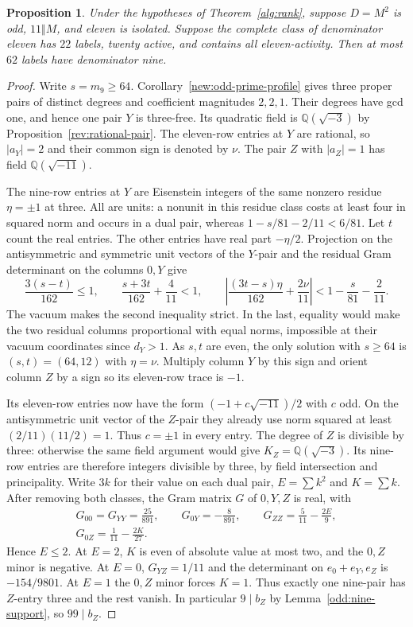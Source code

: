 \documentclass[11pt]{amsart}
\numberwithin{equation}{section}
\newtheorem{proposition}[theorem]{Proposition}
\theoremstyle{definition}
\theoremstyle{plain}
\newcommand{\QQ}{\mathbb Q}
\begin{document}
\begin{proposition}\label{odd:eleven-nine}
Under the hypotheses of Theorem~\ref{alg:rank}, suppose $D=M^2$
is odd, $11\Vert M$, and eleven is isolated. Suppose the complete
class of denominator eleven has $22$ labels, twenty active, and
contains all eleven-activity. Then at most $62$ labels have denominator nine.
\end{proposition}
\begin{proof}
Write $s=m_9\ge64$. Corollary~\ref{new:odd-prime-profile} gives three proper pairs of distinct degrees and coefficient magnitudes $2,2,1$. Their degrees have gcd one, and hence one pair $Y$ is three-free. Its quadratic field is $\QQ(\sqrt{-3})$ by Proposition~\ref{rev:rational-pair}. The eleven-row entries at $Y$ are rational, so $|a_Y|=2$ and their common sign is denoted by $\nu$. The pair $Z$ with $|a_Z|=1$ has field $\QQ(\sqrt{-11})$.

The nine-row entries at $Y$ are Eisenstein integers of the same
nonzero residue $\eta=\pm1$ at three. All are units: a nonunit
in this residue class costs at least four in squared norm and
occurs in a dual pair, whereas $1-s/81-2/11<6/81$. Let $t$
count the real entries. The other entries have real part $-\eta/2$.
Projection on the antisymmetric and symmetric unit vectors of the
$Y$-pair and the residual Gram determinant on the columns $0,Y$ give
\[
 \frac{3(s-t)}{162}\le1,\qquad
 \frac{s+3t}{162}+\frac4{11}<1,\qquad
 \left|\frac{(3t-s)\eta}{162}+\frac{2\nu}{11}\right|
 <1-\frac{s}{81}-\frac2{11}.
\]
The vacuum makes the second inequality strict. In the last,
equality would make the two residual columns proportional with equal
norms, impossible at their vacuum coordinates since $d_Y>1$.
As $s,t$ are even, the only solution with $s\ge64$ is
$(s,t)=(64,12)$ with $\eta=\nu$. Multiply column $Y$ by this sign
and orient column $Z$ by a sign so its eleven-row trace is $-1$.

Its eleven-row entries now have the form $(-1+c\sqrt{-11})/2$
with $c$ odd. On the antisymmetric unit vector of the $Z$-pair
they already use norm squared at least $(2/11)(11/2)=1$.
Thus $c=\pm1$ in every entry. The degree of $Z$ is divisible by
three: otherwise the same field argument would give
$K_Z=\QQ(\sqrt{-3})$. Its nine-row entries are therefore integers
divisible by three, by field intersection and principality. Write $3k$ for their value on each dual pair,
$E=\sum k^2$ and $K=\sum k$. After removing both classes,
the Gram matrix $G$ of $0,Y,Z$ is real, with
\[
 \begin{gathered}
 G_{00}=G_{YY}=\frac{25}{891},\qquad G_{0Y}=-\frac8{891},\qquad
 G_{ZZ}=\frac5{11}-\frac{2E}9,\\
 G_{0Z}=\frac1{11}-\frac{2K}{27}.
 \end{gathered}
\]
Hence $E\le2$. At $E=2$, $K$ is even of absolute value at most
two, and the $0,Z$ minor is negative. At $E=0$, $G_{YZ}=1/11$
and the determinant on $e_0+e_Y,e_Z$ is $-154/9801$.
At $E=1$ the $0,Z$ minor forces $K=1$.
Thus exactly one nine-pair has $Z$-entry three and the rest vanish.
In particular $9\mid b_Z$ by Lemma~\ref{odd:nine-support}, so
$99\mid b_Z$.


\end{proof}
\end{document}
